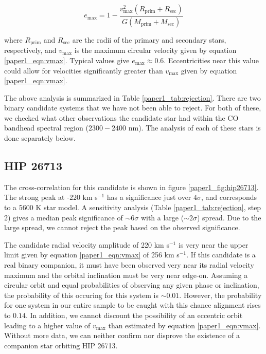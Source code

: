 \begin{equation}
e_\mathrm{max} = 1 - \frac{v_\mathrm{max}^2 (R_\mathrm{prim} + R_\mathrm{sec})}{G(M_\mathrm{prim} + M_\mathrm{sec})}
\label{paper1_eqn:emax}
\end{equation}

where $R_\mathrm{prim} $ and $R_\mathrm{sec}$ are the radii of the primary
and secondary stars, respectively, and $v_\mathrm{max}$ is the maximum
circular velocity given by equation \ref{paper1_eqn:vmax}. Typical values
give $e_\mathrm{max} \approx 0.6$. Eccentricities near this value could
allow for velocities significantly greater than $v_\mathrm{max}$ given by
equation \ref{paper1_eqn:vmax}.

The above analysis is summarized in Table \ref{paper1_tab:rejection}. There
are two binary candidate systems that we have not been able to reject.
 For both of these, we checked what other observations the candidate
star had within the CO bandhead spectral region ($2300-2400$ nm). The analysis of each
of these stars is done separately below.



\subsection{HIP 26713}
The cross-correlation for this candidate is shown in figure
\ref{paper1_fig:hip26713}. The strong peak at -220 km s$^{-1}$ has a
significance just over $4\sigma$, and corresponds to a 5600 K star
model. A sensitivity analysis (Table \ref{paper1_tab:rejection}, step 2) gives a median peak significance of $\sim 6\sigma$
with a large ($\sim 2\sigma$) spread. Due to the large spread, we cannot reject
the peak based on the observed significance.

The candidate radial velocity amplitude of 220 km s$^{-1}$ is very near the upper limit 
given by equation \ref{paper1_eqn:vmax} of 256 km s$^{-1}$. If this candidate is a real binary companion, it
must have been observed very near its radial velocity maximum and the orbital inclination must be very
near edge-on. Assuming a circular orbit and equal probabilities
of observing any given phase or inclination, the probability of this
occuring for this system is $\sim 0.01$. However, the probability for one system in our entire sample to be caught with this chance alignment rises to $0.14$.  In addition, we cannot discount the
possibility of an eccentric orbit leading to a higher value of $v_\mathrm{max}$ than estimated by equation \ref{paper1_eqn:vmax}. Without more data, we can neither confirm nor disprove the existence of a companion star orbiting HIP 26713.
  
